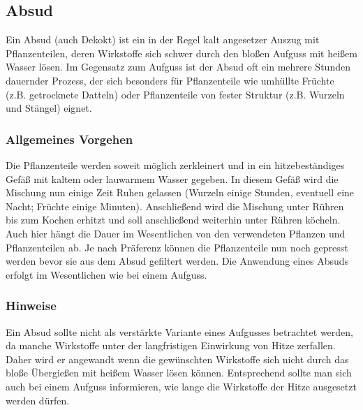 \subsection{Absud}

Ein Absud (auch Dekokt) ist ein in der Regel kalt angesetzer Auszug mit Pflanzenteilen, deren Wirkstoffe sich schwer durch den bloßen Aufguss mit heißem Wasser lösen. Im Gegensatz zum Aufguss ist der Absud oft ein mehrere Stunden dauernder Prozess, der sich besonders für Pflanzenteile wie umhüllte Früchte (z.B. getrocknete Datteln) oder Pflanzenteile von fester Struktur (z.B. Wurzeln und Stängel) eignet.

\subsubsection{Allgemeines Vorgehen}

Die Pflanzenteile werden soweit möglich zerkleinert und in ein hitzebeständiges Gefäß mit kaltem oder lauwarmem Wasser gegeben. In diesem Gefäß wird die Mischung nun einige Zeit Ruhen gelassen (Wurzeln einige Stunden, eventuell eine Nacht; Früchte einige Minuten). Anschließend wird die Mischung unter Rühren bis zum Kochen erhitzt und soll anschließend weiterhin unter Rühren köcheln. Auch hier hängt die Dauer im Wesentlichen von den verwendeten Pflanzen und Pflanzenteilen ab. Je nach Präferenz können die Pflanzenteile nun noch gepresst werden bevor sie aus dem Absud gefiltert werden.
Die Anwendung eines Absuds erfolgt im Wesentlichen wie bei einem Aufguss.

\subsubsection{Hinweise}

Ein Absud sollte nicht als verstärkte Variante eines Aufgusses betrachtet werden, da manche Wirkstoffe unter der langfristigen Einwirkung von Hitze zerfallen. Daher wird er angewandt wenn die gewünschten Wirkstoffe sich nicht durch das bloße Übergießen mit heißem Wasser lösen können. Entsprechend sollte man sich auch bei einem Aufguss informieren, wie lange die Wirkstoffe der Hitze ausgesetzt werden dürfen.

						


						
